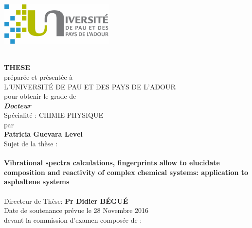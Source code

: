 \documentclass[12pt,a4paper,openany]{book}
\begin{document}
\thispagestyle{empty}
\begin{center}
\includegraphics[height=2.2cm]{logo/uppa.png}
\end{center}
\begin{center}
	\hbox{}\setlength{\baselineskip}{13pt}~\\
	{\Large{\textbf{THESE}}}\\[\baselineskip]
	préparée et présentée à \\[\baselineskip]
	L'UNIVERSIT\'E DE PAU ET DES PAYS DE L'ADOUR \\[\baselineskip]
	pour obtenir le grade de\\[\baselineskip]
		{\Large\textit{{\textbf{Docteur}}}}\\[\baselineskip]
	Spécialité : CHIMIE PHYSIQUE \\[\baselineskip]
	par\\[\baselineskip]
  	\baselineskip=20pt
	{\LARGE{\textbf{Patricia Guevara Level}}}\\
	Sujet de la thèse :\\
	\hbox{}
	\setlength{\baselineskip}{4pt}
	\hbox{}\setlength{\baselineskip}{10pt}~\\
	\vspace*{-5pt}
	{\Large\textbf{Vibrational spectra calculations, fingerprints allow to elucidate composition and reactivity of complex chemical systems: application to asphaltene systems}}~\\[\baselineskip]
	\hbox{}~\\
	
	Directeur de Thèse: \textbf{Pr Didier B\'EGU\'E}\\[\baselineskip]
	Date de soutenance prévue le 28 Novembre 2016\\[\baselineskip]
	devant la commission d'examen composée de :\\[\baselineskip]~\\[\baselineskip] 
	
	\JURY
\end{center}
\end{document}
